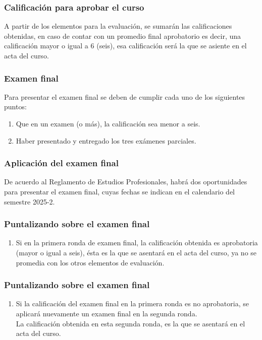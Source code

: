 \documentclass[12pt]{beamer}
\begin{document}
\begin{frame}
\frametitle{Calificación para aprobar el curso}
A partir de los elementos para la evaluación, se sumarán las calificaciones obtenidas, en caso de contar con un promedio final aprobatorio  es decir, una calificación mayor o igual a $6$ (seis), \pause esa calificación será la que se asiente en el acta del curso.
\end{frame}
\begin{frame}
\frametitle{Examen final}
Para presentar el examen final se deben de cumplir cada uno de los siguientes puntos:
\begin{enumerate}[<+->]
\item Que en un examen (o más), la calificación sea menor a seis. %
\item Haber presentado y entregado los tres exámenes parciales.
\end{enumerate}
\end{frame}
\begin{frame}
\frametitle{Aplicación del examen final}
De acuerdo al Reglamento de Estudios Profesionales, habrá dos oportunidades para presentar el examen final, cuyas fechas se indican en el calendario del semestre 2025-2.
\end{frame}
\begin{frame}
\frametitle{Puntalizando sobre el examen final}
\begin{enumerate}[<+->]
\item Si en la primera ronda de examen final, la calificación obtenida es aprobatoria (mayor o igual a seis), ésta es la que se asentará en el acta del curso, ya no se promedia con los otros elementos de evaluación.
\seti
\end{enumerate}
\end{frame}
\begin{frame}
\frametitle{Puntalizando sobre el examen final}
\begin{enumerate}[<+->]
\conti    
\item Si la calificación del examen final en la primera ronda es no aprobatoria, se aplicará nuevamente un examen final en la segunda ronda. 
\\
\bigskip
\pause
La calificación obtenida en esta segunda ronda, es la que se asentará en el acta del curso.
\seti
\end{enumerate}
\end{frame}
\end{document}
